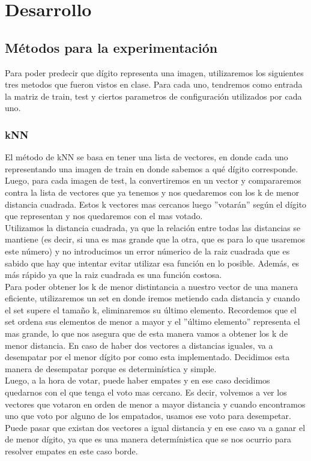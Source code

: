 \section{Desarrollo}

\subsection{M\'etodos para la experimentaci\'on}

Para poder predecir que d\'igito representa una imagen, utilizaremos los siguientes tres metodos que fueron vistos en clase. Para cada uno, tendremos como entrada la matriz de train, test y ciertos parametros de configuraci\'on utilizados por cada uno.

\subsubsection{kNN}

El m\'etodo de kNN se basa en tener una lista de vectores, en donde cada uno representando una imagen de train en donde sabemos a qu\'e d\'igito corresponde. Luego, para cada imagen de test, la convertiremos en un vector y compararemos contra la lista de vectores que ya tenemos y nos quedaremos con los k de menor distancia cuadrada. Estos k vectores mas cercanos luego ''votar\'an'' seg\'un el d\'igito que representan y nos quedaremos con el mas votado.\\

Utilizamos la distancia cuadrada, ya que la relaci\'on entre todas las distancias se mantiene (es decir, si una es mas grande que la otra, que es para lo que usaremos este n\'umero) y no introducimos un error n\'umerico de la raiz cuadrada que es sabido que hay que intentar evitar utilizar esa funci\'on en lo posible. Adem\'as, es m\'as r\'apido ya que la raiz cuadrada es una funci\'on costosa. \\

Para poder obtener los k de menor distintancia a nuestro vector de una manera eficiente, utilizaremos un set en donde iremos metiendo cada distancia y cuando el set supere el tama\~no k, eliminaremos su \'ultimo elemento. Recordemos que el set ordena sus elementos de menor a mayor y el ''\'ultimo elemento'' representa el mas grande, lo que nos asegura que de esta manera vamos a obtener los k de menor distancia. En caso de haber dos vectores a distancias iguales, va a desempatar por el menor d\'igito por como esta implementado. Decidimos esta manera de desempatar porque es determin\'istica y simple.\\
Luego, a la hora de votar, puede haber empates y en ese caso decidimos quedarnos con el que tenga el voto mas cercano. Es decir, volvemos a ver los vectores que votaron en orden de menor a mayor distancia y cuando encontramos uno que voto por alguno de los empatados, usamos ese voto para desempetar. Puede pasar que existan dos vectores a igual distancia y en ese caso va a ganar el de menor d\'igito, ya que es una manera determ\'inistica que se nos ocurrio para resolver empates en este caso borde.

